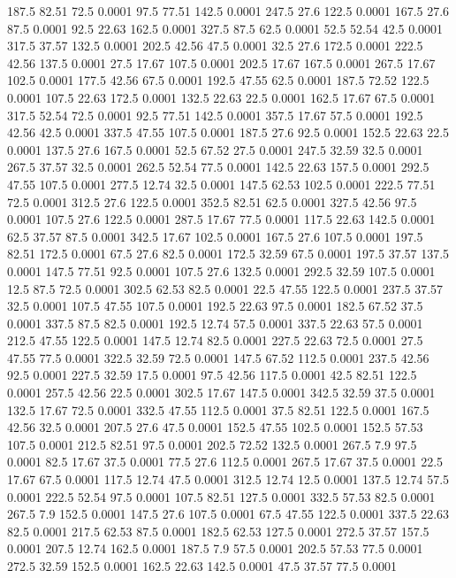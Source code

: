 187.5	82.51	72.5	0.0001
97.5	77.51	142.5	0.0001
247.5	27.6	122.5	0.0001
167.5	27.6	87.5	0.0001
92.5	22.63	162.5	0.0001
327.5	87.5	62.5	0.0001
52.5	52.54	42.5	0.0001
317.5	37.57	132.5	0.0001
202.5	42.56	47.5	0.0001
32.5	27.6	172.5	0.0001
222.5	42.56	137.5	0.0001
27.5	17.67	107.5	0.0001
202.5	17.67	167.5	0.0001
267.5	17.67	102.5	0.0001
177.5	42.56	67.5	0.0001
192.5	47.55	62.5	0.0001
187.5	72.52	122.5	0.0001
107.5	22.63	172.5	0.0001
132.5	22.63	22.5	0.0001
162.5	17.67	67.5	0.0001
317.5	52.54	72.5	0.0001
92.5	77.51	142.5	0.0001
357.5	17.67	57.5	0.0001
192.5	42.56	42.5	0.0001
337.5	47.55	107.5	0.0001
187.5	27.6	92.5	0.0001
152.5	22.63	22.5	0.0001
137.5	27.6	167.5	0.0001
52.5	67.52	27.5	0.0001
247.5	32.59	32.5	0.0001
267.5	37.57	32.5	0.0001
262.5	52.54	77.5	0.0001
142.5	22.63	157.5	0.0001
292.5	47.55	107.5	0.0001
277.5	12.74	32.5	0.0001
147.5	62.53	102.5	0.0001
222.5	77.51	72.5	0.0001
312.5	27.6	122.5	0.0001
352.5	82.51	62.5	0.0001
327.5	42.56	97.5	0.0001
107.5	27.6	122.5	0.0001
287.5	17.67	77.5	0.0001
117.5	22.63	142.5	0.0001
62.5	37.57	87.5	0.0001
342.5	17.67	102.5	0.0001
167.5	27.6	107.5	0.0001
197.5	82.51	172.5	0.0001
67.5	27.6	82.5	0.0001
172.5	32.59	67.5	0.0001
197.5	37.57	137.5	0.0001
147.5	77.51	92.5	0.0001
107.5	27.6	132.5	0.0001
292.5	32.59	107.5	0.0001
12.5	87.5	72.5	0.0001
302.5	62.53	82.5	0.0001
22.5	47.55	122.5	0.0001
237.5	37.57	32.5	0.0001
107.5	47.55	107.5	0.0001
192.5	22.63	97.5	0.0001
182.5	67.52	37.5	0.0001
337.5	87.5	82.5	0.0001
192.5	12.74	57.5	0.0001
337.5	22.63	57.5	0.0001
212.5	47.55	122.5	0.0001
147.5	12.74	82.5	0.0001
227.5	22.63	72.5	0.0001
27.5	47.55	77.5	0.0001
322.5	32.59	72.5	0.0001
147.5	67.52	112.5	0.0001
237.5	42.56	92.5	0.0001
227.5	32.59	17.5	0.0001
97.5	42.56	117.5	0.0001
42.5	82.51	122.5	0.0001
257.5	42.56	22.5	0.0001
302.5	17.67	147.5	0.0001
342.5	32.59	37.5	0.0001
132.5	17.67	72.5	0.0001
332.5	47.55	112.5	0.0001
37.5	82.51	122.5	0.0001
167.5	42.56	32.5	0.0001
207.5	27.6	47.5	0.0001
152.5	47.55	102.5	0.0001
152.5	57.53	107.5	0.0001
212.5	82.51	97.5	0.0001
202.5	72.52	132.5	0.0001
267.5	7.9	97.5	0.0001
82.5	17.67	37.5	0.0001
77.5	27.6	112.5	0.0001
267.5	17.67	37.5	0.0001
22.5	17.67	67.5	0.0001
117.5	12.74	47.5	0.0001
312.5	12.74	12.5	0.0001
137.5	12.74	57.5	0.0001
222.5	52.54	97.5	0.0001
107.5	82.51	127.5	0.0001
332.5	57.53	82.5	0.0001
267.5	7.9	152.5	0.0001
147.5	27.6	107.5	0.0001
67.5	47.55	122.5	0.0001
337.5	22.63	82.5	0.0001
217.5	62.53	87.5	0.0001
182.5	62.53	127.5	0.0001
272.5	37.57	157.5	0.0001
207.5	12.74	162.5	0.0001
187.5	7.9	57.5	0.0001
202.5	57.53	77.5	0.0001
272.5	32.59	152.5	0.0001
162.5	22.63	142.5	0.0001
47.5	37.57	77.5	0.0001
